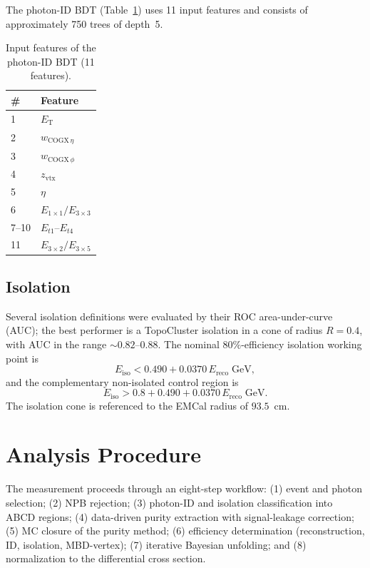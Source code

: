 \documentclass[11pt]{article}
\newcommand{\ET}{E_{\mathrm{T}}}
\newcommand{\Eiso}{E_{\mathrm{iso}}}
\begin{document}
The photon-ID BDT (Table~\ref{tab:idbdt}) uses 11 input features and consists of
approximately 750 trees of depth~5.

\begin{table}[h]
\centering
\caption{Input features of the photon-ID BDT (11 features).}
\label{tab:idbdt}
\begin{tabular}{ll}
\toprule
\# & Feature \\
\midrule
1  & $\ET$ \\
2  & $w_{\mathrm{COGX}\,\eta}$ \\
3  & $w_{\mathrm{COGX}\,\phi}$ \\
4  & $z_{\mathrm{vtx}}$ \\
5  & $\eta$ \\
6  & $E_{1\times1}/E_{3\times3}$ \\
7--10 & $E_{t1}$--$E_{t4}$ \\
11 & $E_{3\times2}/E_{3\times5}$ \\
\bottomrule
\end{tabular}
\end{table}

\subsection{Isolation}

Several isolation definitions were evaluated by their ROC area-under-curve
(AUC); the best performer is a TopoCluster isolation in a cone of radius
$R=0.4$, with AUC in the range $\sim0.82$--$0.88$. The nominal $80\%$-efficiency
isolation working point is
\begin{equation}
  \Eiso < 0.490 + 0.0370\,E_{\mathrm{reco}}\;\mathrm{GeV},
\end{equation}
and the complementary non-isolated control region is
\begin{equation}
  \Eiso > 0.8 + 0.490 + 0.0370\,E_{\mathrm{reco}}\;\mathrm{GeV}.
\end{equation}
The isolation cone is referenced to the EMCal radius of $93.5$~cm.


\section{Analysis Procedure}
\label{sec:analysis}

The measurement proceeds through an eight-step workflow: (1) event and photon
selection; (2) NPB rejection; (3) photon-ID and isolation classification into
ABCD regions; (4) data-driven purity extraction with signal-leakage correction;
(5) MC closure of the purity method; (6) efficiency determination
(reconstruction, ID, isolation, MBD-vertex); (7) iterative Bayesian unfolding;
and (8) normalization to the differential cross section.
\end{document}
